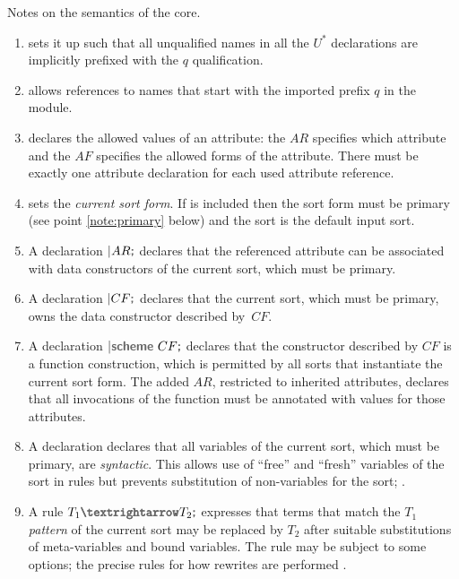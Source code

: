 \documentclass[11pt]{article} %
\begin{document}
Notes on the semantics of the core.
\begin{enumerate}

\item\label{note:module}  sets it up such that all unqualified names in all the $U^*$
  declarations are implicitly prefixed with the $q$ qualification.

\item\label{note:u-import}  allows references to names that start with the imported prefix $q$ in
  the module.

\item\label{note:u-a}  declares the allowed values of an attribute: the $AR$ specifies
  which attribute and the $AF$ specifies the allowed forms of the attribute. There must be exactly
  one attribute declaration for each used attribute reference.

\item\label{note:u-sort}  sets the \emph{current sort form}. If  is included then
  the sort form must be primary (see point \ref{note:primary} below) and the sort is the default
  input sort.

\item\label{note:u-ar} A declaration $\kw{|}AR\kw;$ declares that the referenced attribute can be
  associated with data constructors of the current sort, which must be primary.

\item\label{note:u-cf} A declaration $\kw{|}CF\kw;$ declares that the current sort, which must be
  primary, owns the data constructor described by~$CF$.

\item\label{note:u-scheme} A declaration $\kw{|scheme}~CF\kw;$ declares that the constructor
  described by $CF$ is a function construction, which is permitted by all sorts that instantiate the
  current sort form. The added $AR$, restricted to inherited attributes, declares that all
  invocations of the function must be annotated with values for those attributes.

\item\label{note:u-var} A declaration  declares that all variables of the current
  sort, which must be primary, are \emph{syntactic}. This allows use of ``free'' and ``fresh''
  variables of the sort in rules but prevents substitution of non-variables for the sort; .

\item\label{note:u-rule} A rule $T_1\kwm{→}T_2\kw;$ expresses that terms that match the $T_1$
  \emph{pattern} of the current sort may be replaced by $T_2$ after suitable substitutions of
  meta-variables and bound variables. The rule may be subject to some options; the precise rules for
  how rewrites are performed .


\end{enumerate}
\end{document}
